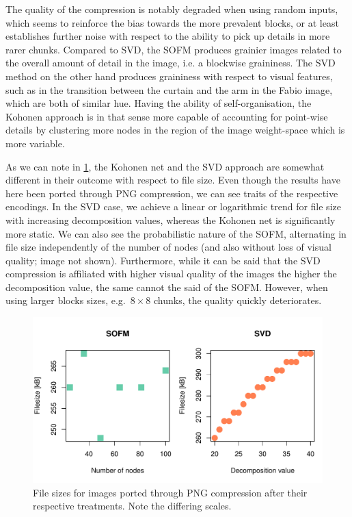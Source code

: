\documentclass[10pt, twocolumn]{article}\usepackage[]{graphicx}\usepackage[]{color}
\makeatletter
\def\maxwidth{ %
  \ifdim\Gin@nat@width>\linewidth
    \linewidth
  \else
    \Gin@nat@width
  \fi
}
\theoremstyle{plain}
\makeatother
\begin{document}
The quality of the compression is notably degraded when using random inputs, which seems to reinforce the bias towards the more prevalent blocks, or at least establishes further noise with respect to the ability to pick up details in more rarer chunks. Compared to SVD, the SOFM produces grainier images related to the overall amount of detail in the image, i.e. a blockwise graininess. The SVD method on the other hand produces graininess with respect to visual features, such as in the transition between the curtain and the arm in the Fabio image, which are both of similar hue. Having the ability of self-organisation, the Kohonen approach is in that sense more capable of accounting for point-wise details by clustering more nodes in the region of the image weight-space which is more variable.

As we can note in \cref{fig:koh_svd}, the Kohonen net and the SVD approach are somewhat different in their outcome with respect to file size. Even though the results have here been ported through PNG compression, we can see traits of the respective encodings. In the SVD case, we achieve a linear or logarithmic trend for file size with increasing decomposition values, whereas the Kohonen net is significantly more static. We can also see the probabilistic nature of the SOFM, alternating in file size independently of the number of nodes (and also without loss of visual quality; image not shown). Furthermore, while it can be said that the SVD compression is affiliated with higher visual quality of the images the higher the decomposition value, the same cannot the said of the SOFM. However, when using larger blocks sizes, e.g.\ $8 \times 8$ chunks, the quality quickly deteriorates. 

\begin{Schunk}
\begin{figure}[H]

{\centering \includegraphics[width=\maxwidth]{figure/twocolumn-koh_svd-1} 

}

\caption[File sizes for images ported through PNG compression after their respective treatments]{File sizes for images ported through PNG compression after their respective treatments. Note the differing scales.}\label{fig:koh_svd}
\end{figure}
\end{Schunk}
\end{document}
